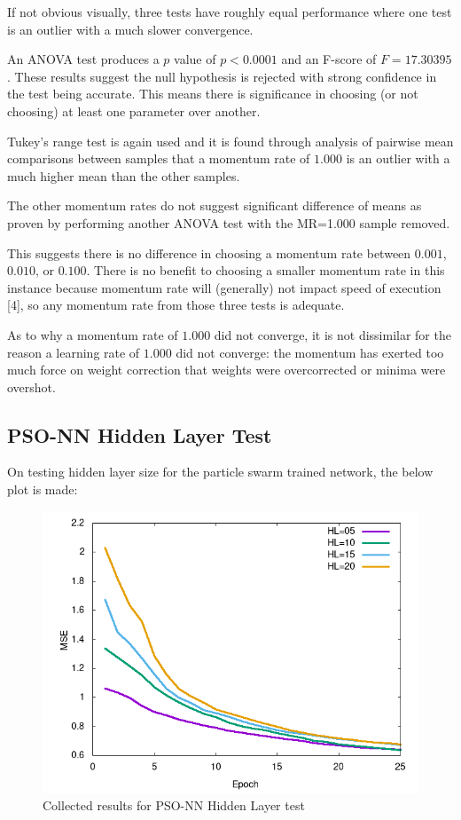 \documentclass[a4paper,12pt]{article}
\begin{document}
If not obvious visually, three tests have roughly equal performance where one test is an outlier with a much slower convergence.

An ANOVA test produces a $p$ value of $p < 0.0001$ and an F-score of $F = 17.30395$. These results suggest the null hypothesis is rejected with strong confidence in the test being accurate. This means there is significance in choosing (or not choosing) at least one parameter over another.

Tukey's range test is again used and it is found through analysis of pairwise mean comparisons between samples that a momentum rate of $1.000$ is an outlier with a much higher mean than the other samples.

The other momentum rates do not suggest significant difference of means as proven by performing another ANOVA test with the MR=1.000 sample removed.

This suggests there is no difference in choosing a momentum rate between $0.001$, $0.010$, or $0.100$. There is no benefit to choosing a smaller momentum rate in this instance because momentum rate will (generally) not impact speed of execution [4], so any momentum rate from those three tests is adequate.

As to why a momentum rate of $1.000$ did not converge, it is not dissimilar for the reason a learning rate of $1.000$ did not converge: the momentum has exerted too much force on weight correction that weights were overcorrected or minima were overshot.

\pagebreak

\subsection{PSO-NN Hidden Layer Test}

On testing hidden layer size for the particle swarm trained network, the below plot is made:

\begin{figure}[h!]
\centering
\includegraphics[scale=0.60]{images/pso-hl-plot.png}
\caption{Collected results for PSO-NN Hidden Layer test}
\label{fig:pso-nn-hl}
\end{figure}
\end{document}

